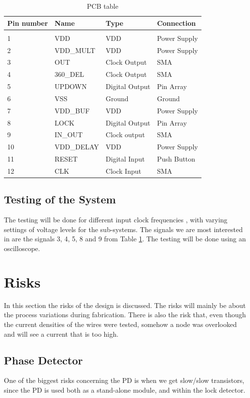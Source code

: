 \documentclass[a4paper,12pt]{article} \usepackage{graphicx}
\begin{document}
\begin{table} [h!]
\begin{tabular}{l  l  l  l}
Pin number & Name & Type & Connection\\ \hline \\
1 & VDD			& VDD				& Power Supply	\\
2 & VDD\_MULT	& VDD				& Power Supply	\\
3 & OUT			& Clock Output		& SMA			\\
4 & 360\_DEL	& Clock Output		& SMA			\\
5 & UPDOWN		& Digital Output	& Pin Array		\\
6 & VSS			& Ground			& Ground		\\
7 & VDD\_BUF	& VDD				& Power Supply	\\
8 & LOCK		& Digital Output	& Pin Array		\\
9 & IN\_OUT		& Clock output		& SMA			\\
10 & VDD\_DELAY	& VDD				& Power Supply	\\
11 & RESET		& Digital Input		& Push Button	\\
12 & CLK		& Clock Input		& SMA
\end{tabular}
\caption{PCB table}
\label{tab:PCB}
\end{table}

\subsection{Testing of the System}
The testing will be done for different input clock frequencies
, with varying settings of voltage levels for the sub-systems. The
signals we are most interested in are the signals 3, 4, 5, 8 and 9
from Table \ref{tab:PCB}. The testing will be done using an oscilloscope.


\section{Risks}
In this section the risks of the design is discussed. The risks will mainly be
about the process variations during fabrication. There is also the risk that,
even though the current densities of the wires were tested, somehow a node was
overlooked and will see a current that is too high.

\subsection{Phase Detector}
One of the biggest risks concerning the PD is when we get
slow/slow transistors, since the PD is used both as a stand-alone
module, and within the lock detector.
\end{document}

